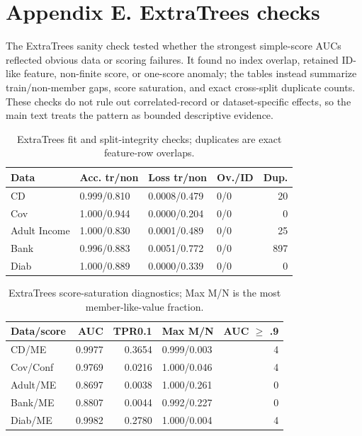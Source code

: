 \documentclass[
  10pt,
  twocolumn]{article}
\begin{document}
\hypertarget{appendix-e-extratrees-sanity-checks}{%
\section{Appendix E. ExtraTrees checks}\label{appendix-e-extratrees-sanity-checks}}

The ExtraTrees sanity check tested whether the strongest simple-score AUCs reflected obvious data or scoring failures. It found no index overlap, retained ID-like feature, non-finite score, or one-score anomaly; the tables instead summarize train/non-member gaps, score saturation, and exact cross-split duplicate counts. These checks do not rule out correlated-record or dataset-specific effects, so the main text treats the pattern as bounded descriptive evidence.

\begin{table}[H]
\centering
\scriptsize
\caption{ExtraTrees fit and split-integrity checks; duplicates are exact feature-row overlaps.}
\label{tab:appendix-extratrees-fit-split}
\setlength{\tabcolsep}{3pt}
\begin{tabular}{@{}l l l l r@{}}
\toprule
Data & Acc. tr/non & Loss tr/non & Ov./ID & Dup. \\
\midrule
CD & 0.999/0.810 & 0.0008/0.479 & 0/0 & 20 \\
Cov & 1.000/0.944 & 0.0000/0.204 & 0/0 & 0 \\
Adult Income & 1.000/0.830 & 0.0001/0.489 & 0/0 & 25 \\
Bank & 0.996/0.883 & 0.0051/0.772 & 0/0 & 897 \\
Diab & 1.000/0.889 & 0.0000/0.339 & 0/0 & 0 \\
\bottomrule
\end{tabular}
\end{table}

\begin{table}[H]
\centering
\scriptsize
\caption{ExtraTrees score-saturation diagnostics; Max M/N is the most member-like-value fraction.}
\label{tab:appendix-extratrees-saturation}
\setlength{\tabcolsep}{3pt}
\begin{tabular}{@{}l r r l r@{}}
\toprule
Data/score & AUC & TPR0.1 & Max M/N & AUC $\geq$ .9 \\
\midrule
CD/ME & 0.9977 & 0.3654 & 0.999/0.003 & 4 \\
Cov/Conf & 0.9769 & 0.0216 & 1.000/0.046 & 4 \\
Adult/ME & 0.8697 & 0.0038 & 1.000/0.261 & 0 \\
Bank/ME & 0.8807 & 0.0044 & 0.992/0.227 & 0 \\
Diab/ME & 0.9982 & 0.2780 & 1.000/0.004 & 4 \\
\bottomrule
\end{tabular}
\end{table}
\end{document}
